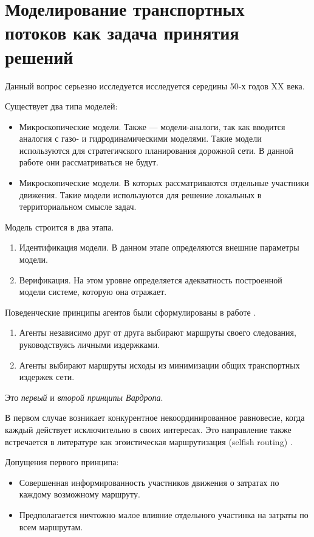 \section{Моделирование транспортных потоков как задача принятия решений}

Данный вопрос серьезно исследуется исследуется середины 50-х годов XX века.

Существует два типа моделей:
\begin{itemize}
	\item Микроскопические модели. Также --- модели-аналоги, так как вводится аналогия с газо- и гидродинамическими моделями. Такие модели используются для стратегичского планирования дорожной сети. В данной работе они рассматриваться не будут. 
	\item Микроскопические модели. В которых рассматриваются отдельные участники движения. Такие модели используются для решение локальных в территориальном смысле задач.
\end{itemize} \cite[225]{gas}

Модель строится в два этапа.

\begin{enumerate}
	\item Идентификация модели. В данном этапе определяются внешние параметры модели.
	\item Верификация. На этом уровне определяется адекватность построенной модели системе, которую она отражает.
\end{enumerate} \cite[225-226]{gas}

Поведенческие принципы агентов были сформулированы в работе \cite{wardrop}.



\begin{enumerate}
	\item Агенты независимо друг от друга выбирают маршруты своего следования, руководствуясь личными издержками.
	\item Агенты выбирают маршруты исходы из минимизации общих транспортных издержек сети.
\end{enumerate}

Это \textit{первый} и \textit{второй принципы Вардропа}.

В первом случае возникает конкурентное некоординированное равновесие, когда каждый действует исключительно в своих интересах. Это направление также встречается в литературе как эгоистическая маршрутизация (selfish routing) \cite[3]{rough2005}.

Допущения первого принципа:
\begin{itemize}
	\item Совершенная информированность участников движения о затратах по каждому возможному маршруту.
	\item Предполагается ничтожно малое влияние отдельного участинка на затраты по всем маршрутам.
\end{itemize}

